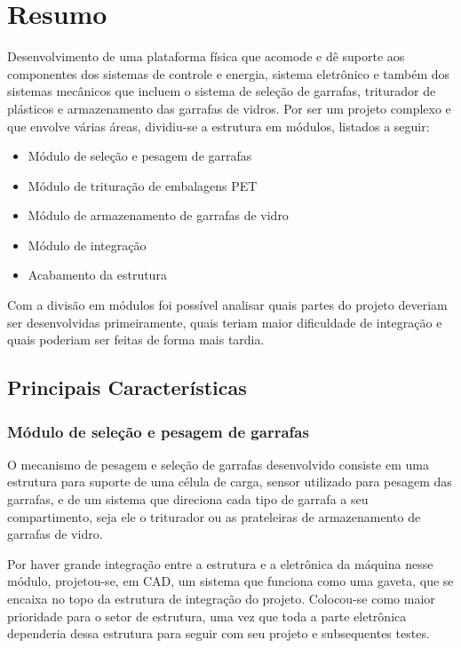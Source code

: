 \section{Resumo}
Desenvolvimento de uma plataforma física que acomode e dê suporte aos componentes dos sistemas de controle e energia, sistema eletrônico e também dos sistemas mecânicos que incluem o sistema de seleção de garrafas, triturador de plásticos e armazenamento das garrafas de vidros. Por ser um projeto complexo e que envolve várias áreas, dividiu-se a estrutura em módulos, listados a seguir:

\begin{itemize}
    \item Módulo de seleção e pesagem de garrafas        
    \item Módulo de trituração de embalagens PET
    \item Módulo de armazenamento de garrafas de vidro
    \item Módulo de integração
    \item Acabamento da estrutura
\end{itemize}

Com a divisão em módulos foi possível analisar quais partes do projeto deveriam ser desenvolvidas primeiramente, quais teriam maior dificuldade de integração e quais poderiam ser feitas de forma mais tardia.

\subsection{Principais Características}

\subsubsection{Módulo de seleção e pesagem de garrafas}
O mecanismo de pesagem e seleção de garrafas desenvolvido consiste em uma estrutura para suporte de uma célula de carga, sensor utilizado para pesagem das garrafas, e de um sistema que direciona cada tipo de garrafa a seu compartimento, seja ele o triturador ou as prateleiras de armazenamento de garrafas de vidro. 

Por haver grande integração entre a estrutura e a eletrônica da máquina nesse módulo, projetou-se, em CAD, um sistema que funciona como uma gaveta, que se encaixa no topo da estrutura de integração do projeto. Colocou-se como maior prioridade para o setor de estrutura, uma vez que toda a parte eletrônica dependeria dessa estrutura para seguir com seu projeto e subsequentes testes. 


